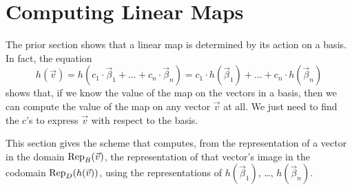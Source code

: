 \section{Computing Linear Maps}
The prior section shows that
a linear map is determined by its action on a basis.
In fact, the equation
\begin{equation*}
  h(\vec{v})
  =h(c_1\cdot\vec{\beta}_1+\dots+c_n\cdot\vec{\beta}_n)
  =c_1\cdot h(\vec{\beta}_1)+\dots +c_n\cdot h(\vec{\beta}_n)
\tag*{}\end{equation*}
shows that, if we know the value of the map on the vectors in a basis, then we
can compute the value of the map on any vector $\vec{v}$ at all.
We just need to  
find the $c$'s to express $\vec{v}$ with respect to the basis.

This section gives the scheme
that computes, from the representation of a vector in the domain 
$\rep{\vec{v}}{B}$,
the representation of that vector's image in the codomain 
$\rep{h(\vec{v})}{D}$,
using the representations of 
\( h(\vec{\beta}_1) \), \ldots, \( h(\vec{\beta}_n) \).














